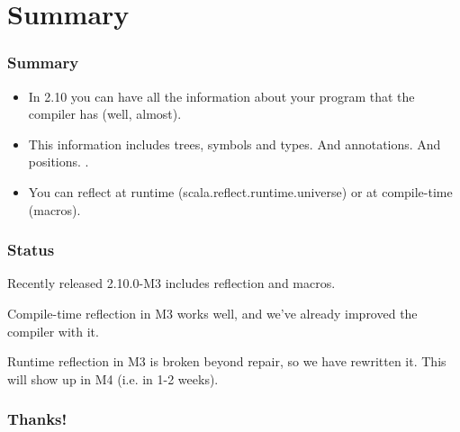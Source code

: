 \documentclass[hyperref={bookmarks=false}]{beamer}
\begin{document}
\section{Summary}

\begin{frame}[fragile]
\frametitle{Summary}

\begin{itemize}
\item In 2.10 you can have all the information about your program that the compiler has (well, almost).
\item This information includes trees, symbols and types. And annotations. And positions.
.
\item You can reflect at runtime (scala.reflect.runtime.universe) or at compile-time (macros).
\end{itemize}
\end{frame}

\begin{frame}[fragile]
\frametitle{Status}

Recently released 2.10.0-M3 includes reflection and macros.

Compile-time reflection in M3 works well, and we've already improved the compiler with it.

Runtime reflection in M3 is broken beyond repair, so we have rewritten it. This will show up in M4 (i.e. in 1-2 weeks).

\end{frame}

\begin{frame}[fragile]
\frametitle{Thanks!}

\centering
{}

\end{frame}
\end{document}
